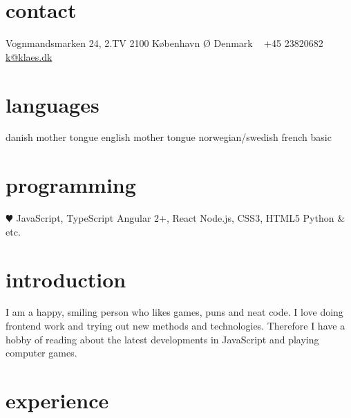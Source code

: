 \documentclass[]{friggeri-cv} %
\begin{document}


\begin{aside} %
\section{contact}
Vognmandsmarken 24, 2.TV
2100 København Ø
Denmark
~
+45 23820682
~
\href{mailto:k@klaes.dk}{k@klaes.dk}
\section{languages}
danish mother tongue
english mother tongue
norwegian/swedish
french basic
\section{programming}
{\color{red} $\varheartsuit$} JavaScript, TypeScript
Angular 2+, React
Node.js, CSS3, HTML5
Python \& etc.
\end{aside}





\section{introduction}

I am a happy, smiling person who likes games, puns and neat code. I love doing frontend work
and trying out new methods and technologies. 
Therefore I have a hobby of reading about the latest developments in JavaScript
and playing computer games.


\section{experience}
\end{document}
